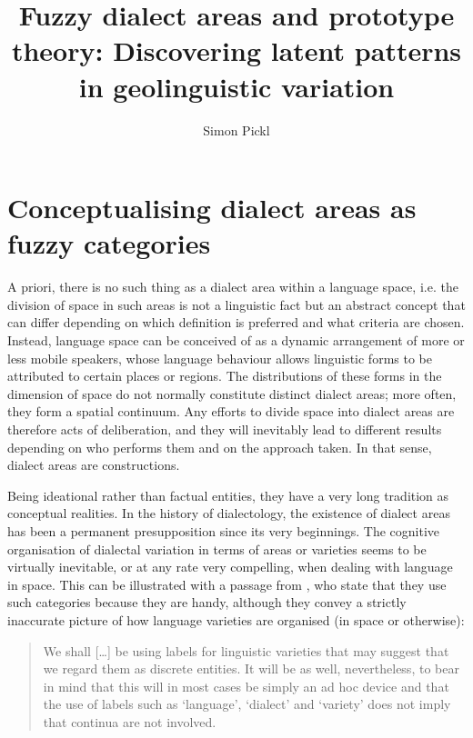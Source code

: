 \documentclass[output=paper]{LSP/langsci}
\author{Simon Pickl\affiliation{University of Salzburg, Department of German}}
\title{Fuzzy dialect areas and prototype theory: {D}iscovering latent patterns in geolinguistic variation}
\begin{document}
 
 
  
\section{Conceptualising dialect areas as fuzzy categories}

A priori, there is no such thing as a dialect area within a language space, i.e. the division of space in such areas is not a linguistic fact but an abstract concept that can differ depending on which definition is preferred and what criteria are chosen. Instead, language space can be conceived of as a dynamic arrangement of more or less mobile speakers, whose language behaviour allows linguistic forms to be attributed to certain places or regions. The distributions of these forms in the dimension of space do not normally constitute distinct dialect areas; more often, they form a spatial continuum. Any efforts to divide space into dialect areas are therefore acts of deliberation, and they will inevitably lead to different results depending on who performs them and on the approach taken. In that sense, dialect areas are constructions.

Being ideational rather than factual entities, they have a very long tradition as conceptual realities. In the history of dialectology, the existence of dialect areas has been a permanent presupposition since its very beginnings. The cognitive organisation of dialectal variation in terms of areas or varieties seems to be virtually inevitable, or at any rate very compelling, when dealing with language in space. This can be illustrated with a passage from \citet{chambers_dialectology_1998}, who state that they use such categories because they are handy, although they convey a strictly inaccurate picture of how language varieties are organised (in space or otherwise):

\begin{quote}
We shall […] be using labels for linguistic varieties that may suggest that we regard them as discrete entities. It will be as well, nevertheless, to bear in mind that this will in most cases be simply an ad hoc device and that the use of labels such as ‘language’, ‘dialect’ and ‘variety’ does not imply that continua are not involved.\\
\citep[12]{chambers_dialectology_1998}
\end{quote}
\end{document}
